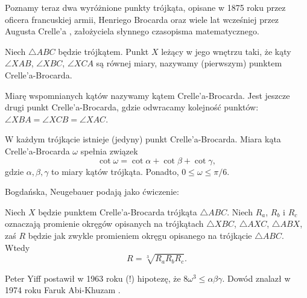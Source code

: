
Poznamy teraz dwa wyróżnione punkty trójkąta, opisane w 1875 roku przez oficera francuskiej armii, Henriego Brocarda oraz wiele lat wcześniej przez Augusta Crelle'a \cite{crelle_1816}, założyciela słynnego czasopisma matematycznego.
%
%

\begin{definition}
    Niech $\triangle ABC$ będzie trójkątem.
    Punkt $X$ leżący w jego wnętrzu taki, że kąty $\angle XAB$, $\angle XBC$, $\angle XCA$ są równej miary, nazywamy (pierwszym) punktem Crelle'a-Brocarda.
\end{definition}

%
%

Miarę wspomnianych kątów nazywamy kątem Crelle'a-Brocarda.
Jest jeszcze drugi punkt Crelle'a-Brocarda, gdzie odwracamy kolejność punktów: $\angle XBA = \angle XCB = \angle XAC$.

\begin{proposition}
    W każdym trójkącie istnieje (jedyny) punkt Crelle'a-Brocarda.
    Miara kąta Crelle'a-Brocarda $\omega$ spełnia związek
    \begin{equation}
        \cot \omega = \cot \alpha + \cot \beta + \cot \gamma,
    \end{equation}
    gdzie $\alpha, \beta, \gamma$ to miary kątów trójkąta.
    Ponadto, $0 \le \omega \le \pi/6$.
\end{proposition}

Bogdańska, Neugebauer \cite[s. 100]{neugebauer_2018} podają jako ćwiczenie:

\begin{proposition}
    Niech $X$ będzie punktem Crelle'a-Brocarda trójkąta $\triangle ABC$.
    Niech $R_a$, $R_b$ i $R_c$ oznaczają promienie okręgów opisanych na trójkątach $\triangle XBC$, $\triangle AXC$, $\triangle ABX$, zaś $R$ będzie jak zwykle promieniem okręgu opisanego na trójkącie $\triangle ABC$.
    Wtedy
    \begin{equation}
        R = \sqrt[3]{R_a R_b R_c}.
    \end{equation}
\end{proposition}

Peter Yiff \cite{yff_1963} postawił w 1963 roku (!) hipotezę, że $8 \omega^3 \le \alpha \beta \gamma$.
%
Dowód znalazł w 1974 roku Faruk Abi-Khuzam \cite{abikhuzam_1974}.
%

